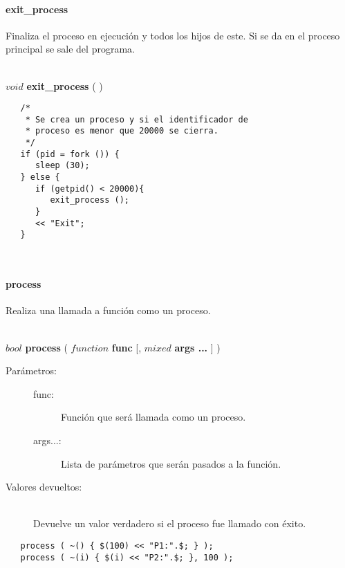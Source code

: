 \paragraph{exit\_process}
Finaliza el proceso en ejecución y todos los hijos de este. Si se da en el
proceso principal se sale del programa.

\hfill \\ $void$ \textbf{exit\_process} ( )  
 \\    
\begin{lstlisting}  
   /*
    * Se crea un proceso y si el identificador de
    * proceso es menor que 20000 se cierra.
    */
   if (pid = fork ()) {
      sleep (30);
   } else {
      if (getpid() < 20000){
         exit_process ();
      }
      << "Exit";
   }
\end{lstlisting}
\hfill\\ 

\paragraph{process}
Realiza una llamada a función como un proceso.

\hfill \\ $bool$ \textbf{process} ( $function$ \textbf{func} [, $mixed$ \textbf{args ...} ]  )  
\begin{description}
\item [Parámetros:] \hfill 
   \begin{description}
   \item[func:] Función que será llamada como un proceso.
   \item[args...:] Lista de parámetros que serán pasados a la función.
   \end{description}
\item[Valores devueltos:] \hfill \\
   Devuelve un valor verdadero si el proceso fue llamado con éxito.
\end{description}

\begin{lstlisting}  
   process ( ~() { $(100) << "P1:".$; } );
   process ( ~(i) { $(i) << "P2:".$; }, 100 );  
\end{lstlisting}
\hfill\\ 

